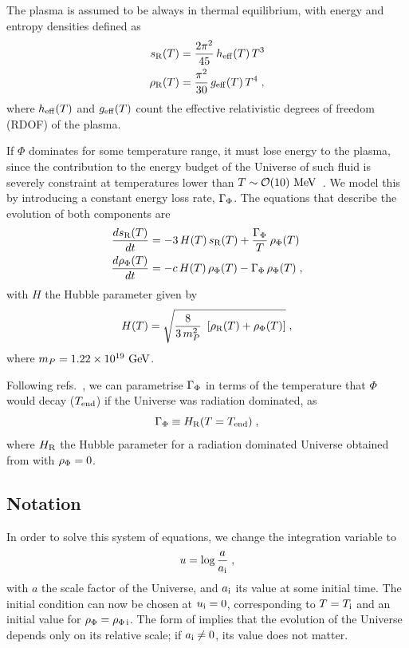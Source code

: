 \documentclass[11pt,a4paper]{article}
\begin{document}
The plasma is assumed to be always in thermal equilibrium, with energy and entropy densities defined as
%
\begin{align}
	s_{\rm R}(T)&=\dfrac{2\pi^2}{45} \,  h_{\rm eff}{}(T) \, T^3 \label{eq:s_def}\\
	\rho_{\rm R}(T)&=\dfrac{\pi^2}{30} \,  g_{\rm eff}{}(T) \, T^4 \label{eq:rho_def} \;,
\end{align}
%
where $h_{\rm eff}{}(T)$ and $g_{\rm eff}{}(T)$ count the effective relativistic degrees of freedom (RDOF) of the plasma.

If $\Phi$ dominates for some temperature range, it must lose energy to the plasma, since the contribution to the energy budget of the Universe of such fluid is severely constraint at temperatures lower than $T \sim \mathcal{O}(10)~{\rm MeV}$~\cite{Allahverdi:2020bys}. We model this by introducing a constant energy loss rate, $\Gamma_{\Phi}$. The equations that describe the evolution of both components are
%
\begin{align}
	\dfrac{ds_{\rm R}(T)}{dt} &= -3 \, H(T)  \, s_{\rm R}(T) + \dfrac{\Gamma_{\Phi}}{T} \, \rho_{\Phi}(T) \label{eq:dsdt} \\ 
	\dfrac{d\rho_{\Phi}(T)}{dt} &= - c \, H(T) \, \rho_{\Phi}(T) - \Gamma_{\Phi} \, \rho_{\Phi}(T) \label{eq:drhoPhidt} \;,
\end{align}
%
with $H$ the Hubble parameter given by
%
\begin{equation}
	H(T) = \sqrt{\dfrac{8}{3\,m_P^2} \ \left[ \rho_{\rm R}(T) + \rho_{\Phi}(T) \right]}\;,
	\label{eq:H_def}
\end{equation}
%
where $m_P = 1.22 \times 10^{19}~{\rm GeV}$.

Following refs.~\cite{Bernal:2019mhf,Arias:2020qty}, we can parametrise $\Gamma_{\Phi}$ in terms of the temperature that $\Phi$ would decay ($T_{\rm end}{}$) if the Universe was radiation dominated, as
%
\begin{equation}
	\Gamma_{\Phi} \equiv H_{\rm R}(T=T_{\rm end}{})\;,
	\label{eq:Tend_def}
\end{equation}
%
where $H_{\rm R}$ the Hubble parameter for a radiation dominated Universe obtained from  with $\rho_{\Phi}=0$.


\subsection{Notation}\label{sec:notation}

In order to solve this system of equations, we change the integration variable to 
%
\begin{equation}
	u=\log\frac{a}{a_{\rm i}{}}\;,	
	\label{eq:u_def}
\end{equation}
%
with $a$ the scale factor of the Universe, and $a_{\rm i}{}$ its value at some initial time. The initial condition can now be chosen at $u_{\rm i}{}=0$, corresponding to $T=T_{\rm i}{}$ and an initial value for $\rho_{\Phi}=\rho_{\Phi\,{\rm i}}$. The form of  implies that the evolution of the Universe depends only on its relative scale; \ie if $a_{\rm i}{} \neq 0$, its value does not matter.
\end{document}
